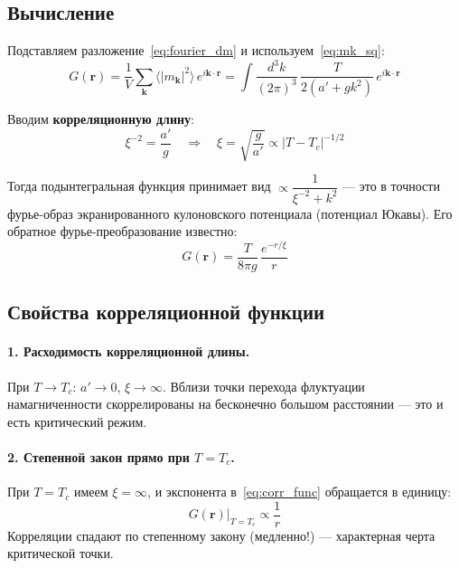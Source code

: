 \documentclass[../general/general]{subfiles}
\begin{document}
\subsection{Вычисление}

Подставляем разложение~\eqref{eq:fourier_dm} и используем~\eqref{eq:mk_sq}:
\begin{equation}
    G(\mathbf{r}) = \frac{1}{V}\sum_\mathbf{k}\langle|m_\mathbf{k}|^2\rangle\,e^{i\mathbf{k}\cdot\mathbf{r}}
    = \int\frac{d^3k}{(2\pi)^3}\,\frac{T}{2(a'+gk^2)}\,e^{i\mathbf{k}\cdot\mathbf{r}}
\end{equation}

Вводим \textbf{корреляционную длину}:
\begin{equation}
    \boxed{\xi^{-2} = \frac{a'}{g}}
    \quad \Rightarrow \quad
    \xi = \sqrt{\frac{g}{a'}} \propto |T - T_c|^{-1/2}
    \label{eq:xi}
\end{equation}

Тогда подынтегральная функция принимает вид $\propto \dfrac{1}{\xi^{-2} + k^2}$ --- это в точности фурье-образ экранированного кулоновского потенциала (потенциал Юкавы). Его обратное фурье-преобразование известно:
\begin{equation}
    \boxed{G(\mathbf{r}) = \frac{T}{8\pi g}\,\frac{e^{-r/\xi}}{r}}
    \label{eq:corr_func}
\end{equation}

\subsection{Свойства корреляционной функции}

\paragraph{1. Расходимость корреляционной длины.} При $T \to T_c$: $a' \to 0$, $\xi \to \infty$. Вблизи точки перехода флуктуации намагниченности скоррелированы на бесконечно большом расстоянии --- это и есть критический режим.

\paragraph{2. Степенной закон прямо при $T = T_c$.} При $T = T_c$ имеем $\xi = \infty$, и экспонента в~\eqref{eq:corr_func} обращается в единицу:
\begin{equation}
    G(\mathbf{r})\big|_{T=T_c} \propto \frac{1}{r}
\end{equation}
Корреляции спадают по степенному закону (медленно!) --- характерная черта критической точки.
\end{document}
